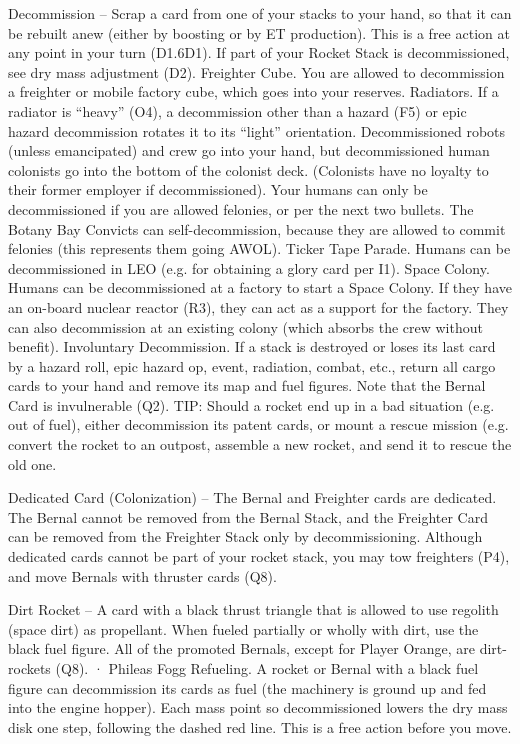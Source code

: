\documentclass[a4paper]{book}
\begin{document}
Decommission – Scrap a card from one of your stacks to your hand, so that it can be rebuilt anew (either by boosting or by ET production). This is a free action at any point in your turn (D1.6D1). If part of your Rocket Stack is decommissioned, see dry mass adjustment (D2).
Freighter Cube. You are allowed to decommission a freighter or mobile factory cube, which goes into your reserves.
Radiators. If a radiator is “heavy” (O4), a decommission other than a hazard (F5) or epic hazard decommission rotates it to its “light” orientation.
Decommissioned robots (unless emancipated) and crew go into your hand, but decommissioned human colonists go into the bottom of the colonist deck. (Colonists have no loyalty to their former employer if decommissioned).
Your humans can only be decommissioned if you are allowed felonies, or per the next two bullets. The Botany Bay Convicts can self-decommission, because they are allowed to commit felonies (this represents them going AWOL).
Ticker Tape Parade. Humans can be decommissioned in LEO (e.g. for obtaining a glory card per I1).
Space Colony. Humans can be decommissioned at a factory to start a Space Colony. If they have an on-board nuclear reactor (R3), they can act as a support for the factory. They can also decommission at an existing colony (which absorbs the crew without benefit).
Involuntary Decommission. If a stack is destroyed or loses its last card by a hazard roll, epic hazard op, event, radiation, combat, etc., return all cargo cards to your hand and remove its map and fuel figures. Note that the Bernal Card is invulnerable (Q2).
TIP: Should a rocket end up in a bad situation (e.g. out of fuel), either decommission its patent cards, or mount a rescue mission (e.g. convert the rocket to an outpost, assemble a new rocket, and send it to rescue the old one.

Dedicated Card (Colonization) – The Bernal and Freighter cards are dedicated. The Bernal cannot be removed from the Bernal Stack, and the Freighter Card can be removed from the Freighter Stack only by decommissioning. Although dedicated cards cannot be part of your rocket stack, you may tow freighters (P4), and move Bernals with thruster cards (Q8).

Dirt Rocket – A card with a black thrust triangle that is allowed to use regolith (space dirt) as propellant. When fueled partially or wholly with dirt, use the black fuel figure. All of the promoted Bernals, except for Player Orange, are dirt-rockets (Q8).
·   	Phileas Fogg Refueling. A rocket or Bernal with a black fuel figure can decommission its cards as fuel (the machinery is ground up and fed into the engine hopper). Each mass point so decommissioned lowers the dry mass disk one step, following the dashed red line. This is a free action before you move.
\end{document}
